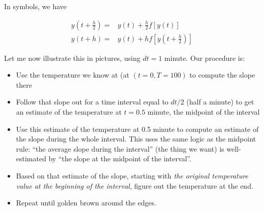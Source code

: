 \documentclass[12ampt]{article}
\begin{document}
In symbols, we have

\begin{align}
  y\left(t+\frac{h}{2}\right) =& y(t) + \frac{h}{2} f\left[y\left(t\right)\right] \\
  y(t+h) =& y(t) + h f\left[y\left(t+\frac{h}{2}\right)\right]
\end{align}

Let me now illustrate this in pictures, using $dt=1$ minute. Our procedure is:

\begin{itemize}
\item Use the temperature we know at (at $(t=0,T=100)$ to compute the slope there
\item Follow that slope out for a time interval equal to $dt/2$ (half a minute)
to get an estimate of the temperature at $t=0.5$ minute, the midpoint of the 
interval
\item Use this estimate of the temperature at 0.5 minute to compute an estimate
of the slope during the whole interval. This uses the same logic as the midpoint
rule: ``the average slope during the interval'' (the thing we want) is well-estimated
by ``the slope at the midpoint of the interval''.
\item Based on that estimate of the slope, starting with {\it the original
temperature value at the beginning of the interval}, figure out the temperature
at the end.
\item Repeat until golden brown around the edges.
\end{itemize}
\end{document}

